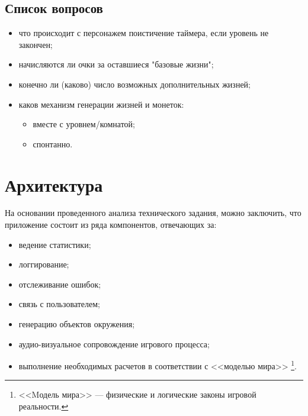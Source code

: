 \documentclass[12pt,a4paper,fullpage,titlepage]{article}
\begin{document}
\subsection{Список вопросов}
\begin{itemize}
	\item что происходит с персонажем поистичение таймера, если уровень не закончен;
	\item начисляются ли очки за оставшиеся "базовые жизни";
	\item конечно ли (каково) число возможных дополнительных жизней;
	\item каков механизм генерации жизней и монеток:
	\begin{itemize}
		\item вместе с уровнем/комнатой;
		\item спонтанно.
	\end{itemize}
\end{itemize}


\newpage
\section{Архитектура}
На основании проведенного анализа технического задания, можно заключить, что приложение состоит из ряда компонентов, отвечающих за:
\begin{itemize}	
	\item ведение статистики;	
	\item логгирование;	
	\item отслеживание ошибок;	
	\item связь с пользователем;	
	\item генерацию объектов окружения;	
	\item аудио-визуальное сопровождение игрового процесса;
	\item выполнение необходимых расчетов в соответствии с <<моделью мира>> \footnote{<<Mодель мира>> --- физические и логические законы игровой реальности.}.\\
\end{itemize}
\end{document}
